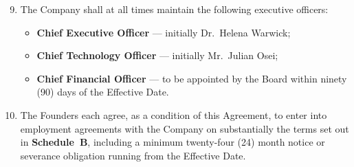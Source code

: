 \begin{enumerate}[leftmargin=*, label=\textbf{4.\arabic*.}, itemsep=5pt]
  \setcounter{enumi}{8}
  \item The Company shall at all times maintain the following executive officers:
        \begin{itemize}[itemsep=2pt]
          \item \textbf{Chief Executive Officer} --- initially Dr.\ Helena Warwick;
          \item \textbf{Chief Technology Officer} --- initially Mr.\ Julian Osei;
          \item \textbf{Chief Financial Officer} --- to be appointed by the Board
                within ninety (90) days of the Effective Date.
        \end{itemize}

  \item The Founders each agree, as a condition of this Agreement, to enter into
        employment agreements with the Company on substantially the terms set out in
        \textbf{Schedule~B}, including a minimum twenty-four (24) month notice or
        severance obligation running from the Effective Date.
\end{enumerate}
